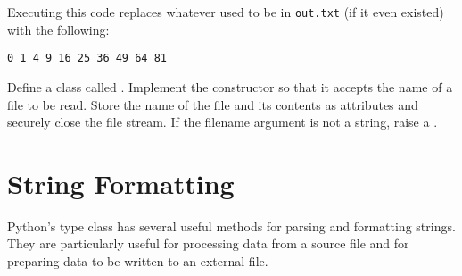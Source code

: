 Executing this code replaces whatever used to be in \texttt{out.txt} (if it even existed) with the following:

\begin{lstlisting}
0 1 4 9 16 25 36 49 64 81
\end{lstlisting}

\begin{problem} %
Define a class called .
Implement the constructor so that it accepts the name of a file to be read.
Store the name of the file and its contents as attributes and securely close the file stream.
If the filename argument is not a string, raise a .
\end{problem}


\section*{String Formatting} %

Python's  type class has several useful methods for parsing and formatting strings.
They are particularly useful for processing data from a source file and for preparing data to be written to an external file.

